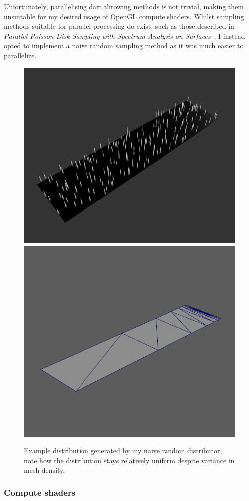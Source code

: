\documentclass[]{acmsiggraph}
\begin{document}
Unfortunately, parallelising dart throwing methods is not trivial, making them unsuitable for my desired usage of OpenGL compute shaders. Whilst sampling methods suitable for parallel processing do exist, such as those described in \textit{Parallel Poisson Disk Sampling with Spectrum Analysis on Surfaces}~\cite{parallelPoisson}, I instead opted to implement a naive random sampling method as it was much easier to parallelize.

\begin{figure}[htbp]
\centering
\includegraphics[width=0.49\linewidth]{images/triangleStripDistribution}
\hfill
\includegraphics[width=0.45\linewidth]{images/triangleMesh}
\caption{\label{figure:distribution} Example distribution generated by my naive random distributor, note how the distribution stays relatively uniform despite variance in mesh density.}
\end{figure}

\subsubsection{Compute shaders} \label{sec:compute shaders}
\end{document}
